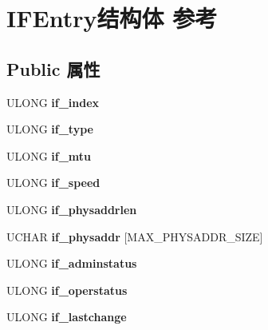 \hypertarget{struct_i_f_entry}{}\section{I\+F\+Entry结构体 参考}
\label{struct_i_f_entry}
\subsection*{Public 属性}
\begin{DoxyCompactItemize}
\item 
\mbox{\label{struct_i_f_entry_a5c6a073c60eb392deeabba6a10d762c8}} 
U\+L\+O\+NG {\bfseries if\+\_\+index}
\item 
\mbox{\label{struct_i_f_entry_a9646d1c4884121d80815cc26348e8efc}} 
U\+L\+O\+NG {\bfseries if\+\_\+type}
\item 
\mbox{\label{struct_i_f_entry_abf30a9339b2798e8c905dc27bc7ae685}} 
U\+L\+O\+NG {\bfseries if\+\_\+mtu}
\item 
\mbox{\label{struct_i_f_entry_a9666608ba47c167946d035e6101b5961}} 
U\+L\+O\+NG {\bfseries if\+\_\+speed}
\item 
\mbox{\label{struct_i_f_entry_a7f44a853608e98fa197194d7bd329388}} 
U\+L\+O\+NG {\bfseries if\+\_\+physaddrlen}
\item 
\mbox{\label{struct_i_f_entry_adb07684f58943b8816ee7cc07ce94183}} 
U\+C\+H\+AR {\bfseries if\+\_\+physaddr} \mbox{[}M\+A\+X\+\_\+\+P\+H\+Y\+S\+A\+D\+D\+R\+\_\+\+S\+I\+ZE\mbox{]}
\item 
\mbox{\label{struct_i_f_entry_af8ac5a8bd26650e9c33d31093c95b78d}} 
U\+L\+O\+NG {\bfseries if\+\_\+adminstatus}
\item 
\mbox{\label{struct_i_f_entry_a129f0aa8e93e340c7d9ec268064ddbd7}} 
U\+L\+O\+NG {\bfseries if\+\_\+operstatus}
\item 
\mbox{\label{struct_i_f_entry_abe8ea2a6fd3e99c84a5ea79dcfc9a009}} 
U\+L\+O\+NG {\bfseries if\+\_\+lastchange}
\item 

\end{DoxyCompactItemize}
